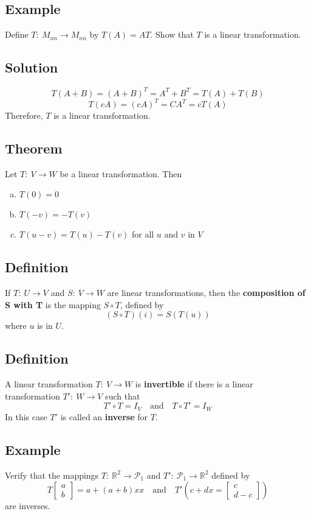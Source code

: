 \subsection*{Example}
Define $T:\:M_{nn}\to M_{nn}$ by $T(A) = AT$. Show that $T$ is a linear transformation.

\subsection*{Solution}
\[T(A+B)=(A+B)^T=A^T+B^T=T(A)+T(B)\]
\[T(cA)=(cA)^T=CA^T=cT(A)\]
Therefore, $T$ is a linear transformation.

\subsection*{Theorem}
Let $T:\:V\to W$ be a linear transformation. Then
\begin{enumerate}[(a)]
    \item $T(0)=0$
    \item $T(-v)=-T(v)$
    \item $T(u-v)=T(u)-T(v)$ for all $u$ and $v$ in $V$
\end{enumerate}

\subsection*{Definition}
If $T:\:U\to V$ and $S:\:V\to W$ are linear transformations, then the
\textbf{composition of S with T} is the mapping $S\circ T$, defined by
\[(S\circ T)(i)=S(T(u))\]
where $u$ is in $U$.

\subsection*{Definition}
A linear transformation $T:\:V\to W$ is \textbf{invertible} if there is a linear
transformation $T':\:W\to V$ such that
\[T'\circ T=I_V \quad \text{and} \quad T\circ T'=I_W\]
In this case $T'$ is called an \textbf{inverse} for $T$.

\subsection*{Example}
Verify that the mappings $T:\:\mathbb{R}^2\to\mathscr{P}_1$ and $T':\:\mathscr{P}_1\to\mathbb{R}^2$ defined by
\[T\begin{bmatrix}
        a \\b
    \end{bmatrix}=a+(a+b)xx \quad \text{and} \quad T'(c+dx=\begin{bmatrix}
        c \\
        d-c
    \end{bmatrix})\]
are inverses.

